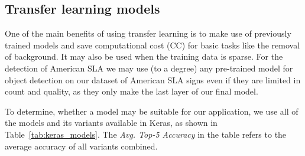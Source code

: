 \subsection{Transfer learning models}
One of the main benefits of using transfer learning is to make use of previously trained models and save computational cost (CC) for basic tasks like the removal of background. It may also be used when the training data is sparse. For the detection of American SLA we may use (to a degree) any pre-trained model for object detection on our dataset of American SLA signs even if they are limited in count and quality, as they only make the last layer of our final model.

To determine, whether a model may be suitable for our application, we use all of the models and its variants available in Keras\cite{keras}, as shown in Table~\ref{tab:keras_models}. The \textit{Avg. Top-5 Accuracy} in the table refers to the average accuracy of all variants combined.
